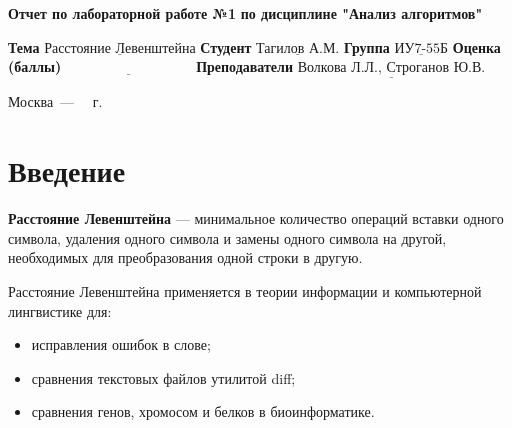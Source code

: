 \documentclass[12pt]{report}
\begin{document}
\begin{titlepage}
        \begin{center}
            \noindent\begin{minipage}{1.3\textwidth}
                         \centering
                         \Large\textbf{  Отчет по лабораторной работе №1}\newline
                         \textbf{по дисциплине "Анализ алгоритмов"}\newline\newline
            \end{minipage}
        \end{center}

        \noindent\textbf{Тема} $\underline{\text{Расстояние Левенштейна}}$\newline\newline
        \noindent\textbf{Студент} $\underline{\text{Тагилов А.М.}}$\newline\newline
        \noindent\textbf{Группа} $\underline{\text{ИУ7-55Б}}$\newline\newline
        \noindent\textbf{Оценка (баллы)} $\underline{\text{~~~~~~~~~~~~~~~~~~~~~~~~~~~}}$\newline\newline
        \noindent\textbf{Преподаватели} $\underline{\text{Волкова Л.Л., Строганов Ю.В.}}$\newline\newline\newline

        \begin{center}
            \vfill
            Москва~---~\the\year
            ~г.
        \end{center}
    \end{titlepage}

    \renewcommand{\contentsname}{Содержание}
    \tableofcontents

    \newpage
    \chapter*{Введение}
    \textbf{Расстояние Левенштейна} --- минимальное количество операций вставки одного символа, удаления одного символа
    и замены одного символа на другой, необходимых для преобразования одной строки в другую.

    Расстояние Левенштейна применяется в теории информации и компьютерной лингвистике для:
    \begin{itemize}
        \item исправления ошибок в слове;
        \item сравнения текстовых файлов утилитой diff;
        \item сравнения генов, хромосом и белков в биоинформатике.
    \end{itemize}
\end{document}
